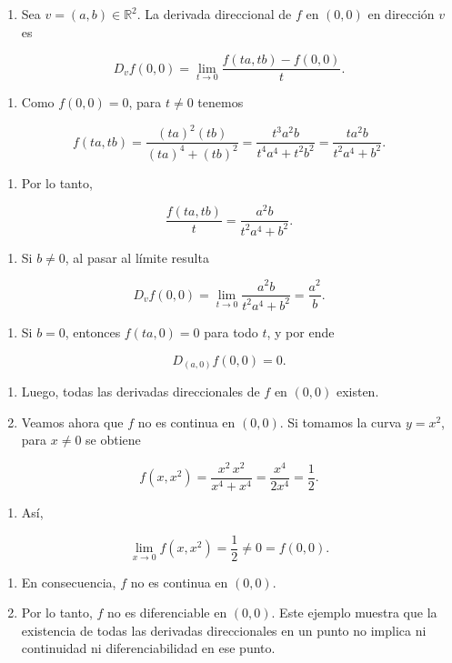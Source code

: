 \begin{bookproof}{}
\begin{enumerate}
\item Sea $v=(a,b)\in \mathbb{R}^2$. La derivada direccional de $f$ en $(0,0)$ en dirección $v$ es
\end{enumerate}
\[
D_vf(0,0)=\lim_{t\to 0}\frac{f(ta,tb)-f(0,0)}{t}.
\]
\begin{enumerate}[start=2]
\item Como $f(0,0)=0$, para $t\neq 0$ tenemos
\end{enumerate}
\[
f(ta,tb)=\frac{(ta)^2(tb)}{(ta)^4+(tb)^2}=\frac{t^3a^2b}{t^4a^4+t^2b^2}=\frac{ta^2b}{t^2a^4+b^2}.
\]
\begin{enumerate}[start=3]
\item Por lo tanto,
\end{enumerate}
\[
\frac{f(ta,tb)}{t}=\frac{a^2b}{t^2a^4+b^2}.
\]
\begin{enumerate}[start=4]
\item Si $b\neq 0$, al pasar al límite resulta
\end{enumerate}
\[
D_vf(0,0)=\lim_{t\to 0}\frac{a^2b}{t^2a^4+b^2}=\frac{a^2}{b}.
\]
\begin{enumerate}[start=5]
\item Si $b=0$, entonces $f(ta,0)=0$ para todo $t$, y por ende
\end{enumerate}
\[
D_{(a,0)}f(0,0)=0.
\]
\begin{enumerate}[start=6]
\item Luego, todas las derivadas direccionales de $f$ en $(0,0)$ existen.
\item Veamos ahora que $f$ no es continua en $(0,0)$. Si tomamos la curva $y=x^2$, para $x\neq 0$ se obtiene
\end{enumerate}
\[
f(x,x^2)=\frac{x^2\,x^2}{x^4+x^4}=\frac{x^4}{2x^4}=\frac{1}{2}.
\]
\begin{enumerate}[start=8]
\item Así,
\end{enumerate}
\[
\lim_{x\to 0}f(x,x^2)=\frac{1}{2}\neq 0=f(0,0).
\]
\begin{enumerate}[start=9]
\item En consecuencia, $f$ no es continua en $(0,0)$.
\item Por lo tanto, $f$ no es diferenciable en $(0,0)$. Este ejemplo muestra que la existencia de todas las derivadas direccionales en un punto no implica ni continuidad ni diferenciabilidad en ese punto.
\end{enumerate}
\bookqed
\end{bookproof}

